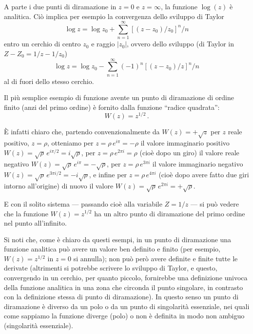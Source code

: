 \documentclass[11pt, a4paper]{book}
\numberwithin{equation}{section}
\begin{document}
A parte i due punti di diramazione in $z=0$ e $z=\infty$, la funzione $\log(z)$ è analitica. Ciò implica per esempio la convergenza dello sviluppo di Taylor
\begin{equation}
\log z = \log z_0 + \sum_{n=1}^{\infty} \left[(z-z_0)/z_0\right]^n \big/ n \tag{5}
\end{equation}
entro un cerchio di centro $z_0$ e raggio $|z_0|$, ovvero dello sviluppo (di Taylor in $Z - Z_0 = 1/z - 1/z_0$)
\begin{equation}
\log z = \log z_0 - \sum_{n=1}^{\infty} (-1)^n \left[(z-z_0)/z\right]^n \big/ n \tag{6}
\end{equation}
al di fuori dello stesso cerchio.

Il più semplice esempio di funzione avente un punto di diramazione di ordine finito (anzi del primo ordine) è fornito dalla funzione ``radice quadrata'':
\begin{equation}
W(z) = z^{1/2}\,. \tag{7}
\end{equation}

È infatti chiaro che, partendo convenzionalmente da $W(z) = +\sqrt{z}$ per $z$ reale positivo, $z=\rho$, otteniamo per $z = \rho\,e^{i\pi} = -\rho$ il valore immaginario positivo $W(z) = \sqrt{\rho}\,e^{i\pi/2} = i\sqrt{\rho}$, per $z = \rho\,e^{2\pi i} = \rho$ (cioè dopo un giro) il valore reale negativo $W(z) = \sqrt{\rho}\,e^{i\pi} = -\sqrt{\rho}$, per $z = \rho\,e^{3\pi i}$ il valore immaginario negativo $W(z) = \sqrt{\rho}\,e^{3\pi i/2} = -i\sqrt{\rho}$, e infine per $z = \rho\,e^{4\pi i}$ (cioè dopo avere fatto due giri intorno all'origine) di nuovo il valore $W(z) = \sqrt{\rho}\,e^{2\pi i} = +\sqrt{\rho}$.

E con il solito sistema — passando cioè alla variabile $Z = 1/z$ — si può vedere che la funzione $W(z) = z^{1/2}$ ha un altro punto di diramazione del primo ordine nel punto all'infinito.

Si noti che, come è chiaro da questi esempi, in un punto di diramazione una funzione analitica può avere un valore ben definito e finito (per esempio, $W(z) = z^{1/2}$ in $z=0$ si annulla); non può però avere definite e finite tutte le derivate (altrimenti si potrebbe scrivere lo sviluppo di Taylor, e questo, convergendo in un cerchio, per quanto piccolo, fornirebbe una definizione univoca della funzione analitica in una zona che circonda il punto singolare, in contrasto con la definizione stessa di punto di diramazione). In questo senso un punto di diramazione è diverso da un polo o da un punto di singolarità essenziale, nei quali come sappiamo la funzione diverge (polo) o non è definita in modo non ambiguo (singolarità essenziale).
\end{document}
